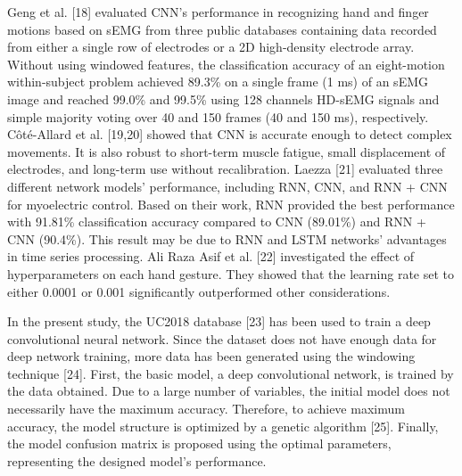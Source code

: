 Geng et al. [18] evaluated CNN's performance in recognizing hand and finger motions based on sEMG from three public databases containing data recorded from either a single row of electrodes or a 2D high-density electrode array. Without using windowed features, the classification accuracy of an eight-motion within-subject problem achieved 89.3\% on a single frame (1 ms) of an sEMG image and reached 99.0\% and 99.5\% using 128 channels HD-sEMG signals and simple majority voting over 40 and 150 frames (40 and 150 ms), respectively. Côté-Allard et al. [19,20] showed that CNN is accurate enough to detect complex movements. It is also robust to short-term muscle fatigue, small displacement of electrodes, and long-term use without recalibration. Laezza [21] evaluated three different network models' performance, including RNN, CNN, and RNN + CNN for myoelectric control. Based on their work, RNN provided the best performance with 91.81\%  classification accuracy compared to CNN (89.01\%) and RNN + CNN (90.4\%). This result may be due to RNN and LSTM networks' advantages in time series processing. Ali Raza Asif et al. [22] investigated the effect of hyperparameters on each hand gesture. They showed that the learning rate set to either 0.0001 or 0.001 significantly outperformed other considerations.

In the present study, the UC2018 database [23] has been used to train a deep convolutional neural network. Since the dataset does not have enough data for deep network training, more data has been generated using the windowing technique [24]. First, the basic model, a deep convolutional network, is trained by the data obtained. Due to a large number of variables, the initial model does not necessarily have the maximum accuracy. Therefore, to achieve maximum accuracy, the model structure is optimized by a genetic algorithm [25]. Finally, the model confusion matrix is proposed using the optimal parameters, representing the designed model's performance.
